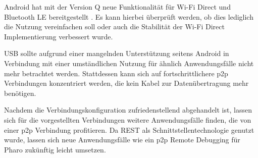 Android hat mit der Version Q neue Funktionalität für Wi-Fi Direct und Bluetooth LE bereitgestellt \cite{androidQ}. Es kann hierbei überprüft werden, ob dies lediglich die Nutzung vereinfachen soll oder auch die Stabilität der Wi-Fi Direct Implementierung verbessert wurde.

USB sollte aufgrund einer mangelnden Unterstützung seitens Android in \linebreak Verbindung mit einer umständlichen Nutzung für ähnlich Anwendungsfälle nicht mehr betrachtet werden. Stattdessen kann sich auf fortschrittlichere p2p Verbindungen konzentriert werden, die kein Kabel zur Datenübertragung mehr benötigen.

Nachdem die Verbindungskonfiguration zufriedenstellend abgehandelt ist, lassen sich für die vorgestellten Verbindungen weitere Anwendungsfälle finden, die von einer p2p Verbindung profitieren. Da REST als Schnittstellentechnologie genutzt wurde, lassen sich neue Anwendungsfälle wie ein p2p Remote Debugging für Pharo zukünftig leicht umsetzen.